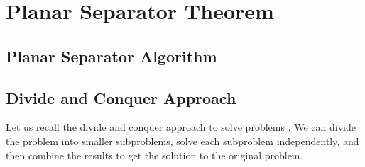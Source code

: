 \chapter{Planar Separator Theorem}

\section{Planar Separator Algorithm} \label{sec:planar-sep}


\section{Divide and Conquer Approach}
Let us recall the divide and conquer approach to solve problems
\cite{cormenIntroductionAlgorithms2022}. We can divide the problem into
smaller subproblems, solve each subproblem independently, and then
combine the results to get the solution to the original problem.
